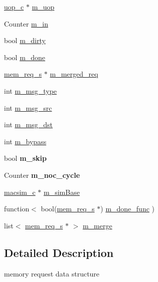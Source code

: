 \begin{DoxyCompactItemize}
\hyperlink{classuop__c}{uop\_\-c} $\ast$ \hyperlink{structmem__req__s_ac912d0ec02a27cbd6d126ab1482c201b}{m\_\-uop}
\item 
Counter \hyperlink{structmem__req__s_a2755c0f5390e5101c68dcfa17835f060}{m\_\-in}
\item 
bool \hyperlink{structmem__req__s_ad03ad960252da07338a40f46a4c2f0da}{m\_\-dirty}
\item 
bool \hyperlink{structmem__req__s_af3191e32583b52626b60ed9817a3768a}{m\_\-done}
\item 
\hyperlink{structmem__req__s}{mem\_\-req\_\-s} $\ast$ \hyperlink{structmem__req__s_a3b87d3a717d7bb0f87634a8c7504a5b5}{m\_\-merged\_\-req}
\item 
int \hyperlink{structmem__req__s_ad9e7fb008600b23a34448c1cb8efe835}{m\_\-msg\_\-type}
\item 
int \hyperlink{structmem__req__s_a858166c5e9fa9c8078088c6e04941a9f}{m\_\-msg\_\-src}
\item 
int \hyperlink{structmem__req__s_a16204d197e4dab80807c947af110160e}{m\_\-msg\_\-dst}
\item 
int \hyperlink{structmem__req__s_a45680e38670bb6ed3b65f11dc22e4c4a}{m\_\-bypass}
\item 
\hypertarget{structmem__req__s_a4c3cf0a762ff754afd5d5170a106de09}{
bool {\bfseries m\_\-skip}}
\label{structmem__req__s_a4c3cf0a762ff754afd5d5170a106de09}

\item 
\hypertarget{structmem__req__s_ad1e86b986bd6153a898b0581bbcf1efb}{
Counter {\bfseries m\_\-noc\_\-cycle}}
\label{structmem__req__s_ad1e86b986bd6153a898b0581bbcf1efb}

\item 
\hyperlink{classmacsim__c}{macsim\_\-c} $\ast$ \hyperlink{structmem__req__s_a7477749204e08ce0a7aa41607a23d74f}{m\_\-simBase}
\item 
function$<$ bool(\hyperlink{structmem__req__s}{mem\_\-req\_\-s} $\ast$) \hyperlink{structmem__req__s_a3170f1143be13457e12b0d0c6f8beb25}{m\_\-done\_\-func} )
\item 
list$<$ \hyperlink{structmem__req__s}{mem\_\-req\_\-s} $\ast$ $>$ \hyperlink{structmem__req__s_a821fa41554b58f5c5b1b751b6e5f1721}{m\_\-merge}
\end{DoxyCompactItemize}


\subsection{Detailed Description}
memory request data structure 

